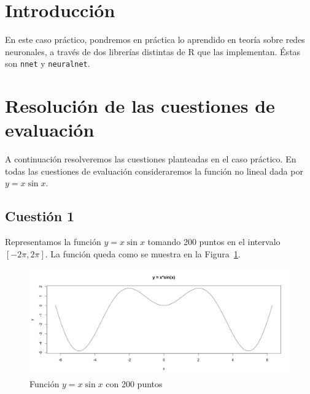 \documentclass[12pt,a4paper,twoside,openright,titlepage,final]{article}
\author{José Ignacio Escribano}
\title{}
\begin{document}
\setcounter{page}{1}


\listoffigures
\thispagestyle{empty}
\newpage

\tableofcontents
\thispagestyle{empty}
\newpage


\setcounter{page}{1}

\section{Introducción}

En este caso práctico, pondremos en práctica lo aprendido en teoría sobre redes neuronales, a través de dos librerías distintas de R que las implementan. Éstas son \texttt{nnet} y \texttt{neuralnet}.

\section{Resolución de las cuestiones de evaluación}

A continuación resolveremos las cuestiones planteadas en el caso práctico. En todas las cuestiones de evaluación consideraremos la función no lineal dada por $y = x \sin x$.

\subsection{Cuestión 1}
Representamos la función $y = x \sin x$ tomando 200 puntos en el intervalo $[-2\pi, 2\pi]$. La función queda como se muestra en la Figura~\ref{fig:funcion_con_type}.\\

\begin{figure}[tbph!]
\centering
\includegraphics[width=0.8\linewidth]{imagenes/funcion_con_type}
\caption{Función $y = x\sin x$ con 200 puntos}
\label{fig:funcion_con_type}
\end{figure}
\end{document}
